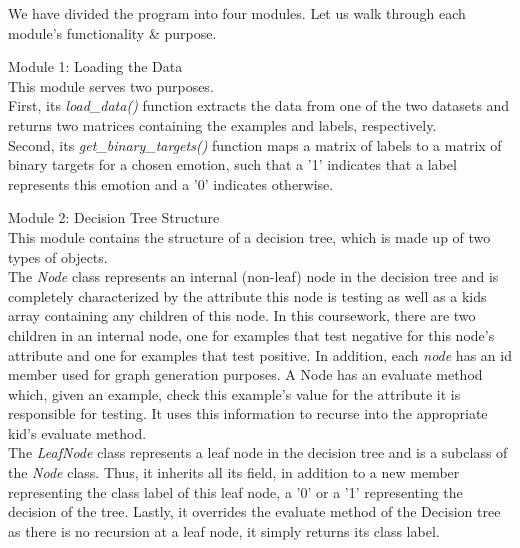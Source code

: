 We have divided the program into four modules. Let us walk through each module's functionality \& purpose.

Module 1: Loading the Data \\
This module serves two purposes.\\
First, its \emph{load\_data()} function extracts the data from one of the two datasets
and returns two matrices containing the examples and labels, respectively. \\
Second, its \emph{get\_binary\_targets()} function maps a matrix of labels to a matrix of binary targets for a chosen emotion,
such that a '1' indicates that a label represents this emotion and a '0' indicates otherwise.

Module 2: Decision Tree Structure \\
This module contains the structure of a decision tree, which is made up of two types of objects. \\
The \emph{Node} class represents an internal (non-leaf) node in the decision tree and is completely characterized by the attribute
this node is testing as well as a kids array containing any children of this node. In this coursework, there are two children
in an internal node, one for examples that test negative for this node's attribute and one for examples that test positive.
In addition, each \emph{node} has an id member used for graph generation purposes.
A Node has an evaluate method which, given an example, check this example's value for the attribute it is responsible for testing.
It uses this information to recurse into the appropriate kid's evaluate method. \\
The \emph{LeafNode} class represents a leaf node in the decision tree and is a subclass of the \emph{Node} class.
Thus, it inherits all its field, in addition to a new member representing the class label of this leaf node,
a '0' or a '1' representing the decision of the tree.
Lastly, it overrides the evaluate method of the Decision tree as there is no recursion at a leaf node, it simply returns its class label.\\


